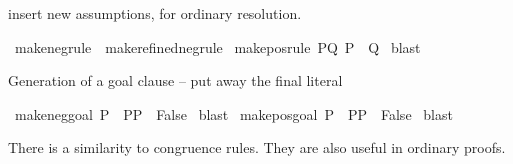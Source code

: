 \begin{isabellebody}
\begin{isamarkuptext}
insert new assumptions, for ordinary resolution.%
\end{isamarkuptext}\isamarkuptrue%
\isamarkupfalse%
\ make{\isacharunderscore}{\kern0pt}neg{\isacharunderscore}{\kern0pt}rule{\isacharprime}{\kern0pt}\ {\isacharequal}{\kern0pt}\ make{\isacharunderscore}{\kern0pt}refined{\isacharunderscore}{\kern0pt}neg{\isacharunderscore}{\kern0pt}rule\isanewline
\isanewline
{}\isamarkupfalse%
\ make{\isacharunderscore}{\kern0pt}pos{\isacharunderscore}{\kern0pt}rule{\isacharprime}{\kern0pt}{\isacharcolon}{\kern0pt}\ {\isachardoublequoteopen}{\isasymlbrakk}P{\isasymor}Q{\isacharsemicolon}{\kern0pt}\ {\isasymnot}P{\isasymrbrakk}\ {\isasymLongrightarrow}\ Q{\isachardoublequoteclose}\isanewline
%
\isadelimproof
%
\endisadelimproof
%
\isatagproof
{}\isamarkupfalse%
\ blast%
\endisatagproof
{\isafoldproof}%
%
\isadelimproof
%
\endisadelimproof
%
\begin{isamarkuptext}%
Generation of a goal clause -- put away the final literal%
\end{isamarkuptext}\isamarkuptrue%
\isamarkupfalse%
\ make{\isacharunderscore}{\kern0pt}neg{\isacharunderscore}{\kern0pt}goal{\isacharcolon}{\kern0pt}\ {\isachardoublequoteopen}{\isasymnot}P\ {\isasymLongrightarrow}\ {\isacharparenleft}{\kern0pt}{\isacharparenleft}{\kern0pt}{\isasymnot}P{\isasymLongrightarrow}P{\isacharparenright}{\kern0pt}\ {\isasymLongrightarrow}\ False{\isacharparenright}{\kern0pt}{\isachardoublequoteclose}\isanewline
%
\isadelimproof
%
\endisadelimproof
%
\isatagproof
{}\isamarkupfalse%
\ blast%
\endisatagproof
{\isafoldproof}%
%
\isadelimproof
\isanewline
%
\endisadelimproof
\isanewline
{}\isamarkupfalse%
\ make{\isacharunderscore}{\kern0pt}pos{\isacharunderscore}{\kern0pt}goal{\isacharcolon}{\kern0pt}\ {\isachardoublequoteopen}P\ {\isasymLongrightarrow}\ {\isacharparenleft}{\kern0pt}{\isacharparenleft}{\kern0pt}P{\isasymLongrightarrow}{\isasymnot}P{\isacharparenright}{\kern0pt}\ {\isasymLongrightarrow}\ False{\isacharparenright}{\kern0pt}{\isachardoublequoteclose}\isanewline
%
\isadelimproof
%
\endisadelimproof
%
\isatagproof
{}\isamarkupfalse%
\ blast%
\endisatagproof
{\isafoldproof}%
%
\isadelimproof
%
\endisadelimproof
%
\isadelimdocument
%
\endisadelimdocument
%
\isatagdocument
%
\isamarkuptrue%
%
\endisatagdocument
{\isafolddocument}%
%
\isadelimdocument
%
\endisadelimdocument
%
\begin{isamarkuptext}%
There is a similarity to congruence rules. They are also useful in ordinary proofs.%

\end{isamarkuptext}
\end{isabellebody}
